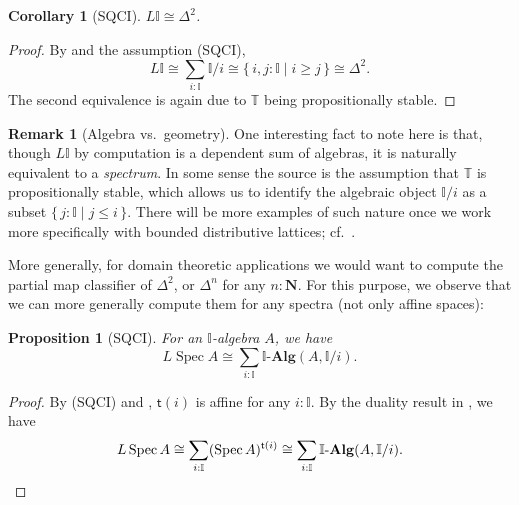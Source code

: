 \documentclass[a4paper,12pt]{amsart}
\newtheorem{corollary}[theorem]{Corollary}
\newtheorem{proposition}[theorem]{Proposition}
\theoremstyle{definition}
\newtheorem{remark}[theorem]{Remark}
\newtheorem*{axiom}{Axiom}
\newcommand{\mb}[1]{\mathbf{#1}}
\newcommand{\mbb}[1]{\mathbb{#1}}
\newcommand{\T}{\mbb T}
\newcommand{\I}{\mbb I}
\newcommand{\ms}[1]{\mathsf{#1}}
\newcommand{\alg}{\text{-}\mb{Alg}}
\newcommand{\scomp}[2]{\{\,#1\mid#2\,\}}
\newcommand{\N}{\mb N}
\newcommand{\spec}{\operatorname{Spec}}
\newcommand\istsym{\ms{t}}
\newcommand\ist[1]{\istsym(#1)}
\begin{document}
\begin{corollary}[SQCI]
  $L \I \cong \Delta^2$.
\end{corollary}
\begin{proof}
  By  and the assumption (SQCI),
  \[ L\I \cong \sum_{i:\I}\I/i \cong \scomp{i,j : \I}{i \ge j} \cong \Delta^2\text{.} \]
  The second equivalence is again due to $\T$ being propositionally stable.
\end{proof}

\begin{remark}[Algebra vs.\ geometry]\label{rem:alggeoI}
  One interesting fact to note here is that, though $L\I$ by computation is a dependent sum of algebras, it is naturally equivalent to a \emph{spectrum}. In some sense the source is the assumption that $\T$ is propositionally stable, which allows us to identify the algebraic object $\I/i$ as a subset $\scomp{j : \I}{j \le i}$. There will be more examples of such nature once we work more specifically with bounded distributive lattices; cf.\ .
\end{remark}

More generally, for domain theoretic applications we would want to compute the partial map classifier of $\Delta^2$, or $\Delta^n$ for any $n:\N$. For this purpose, we observe that we can more generally compute them for any spectra (not only affine spaces):

\begin{proposition}[SQCI]\label{prop:liftofaffine}
  For an $\I$-algebra $A$, we have
  \[ L\spec A \cong \sum_{i:\I}\I\alg(A,\I/i)\text{.} \]
\end{proposition}
\begin{proof}
  By (SQCI) and , $\ist{i}$ is affine for any $i:\I$. By the duality result in , we have
  \[ L\spec A \cong \sum_{i:\I}(\spec A)^{\ist{i}}\cong \sum_{i:\I}\I\alg(A,\I/i). \qedhere \]
\end{proof}



\end{document}
